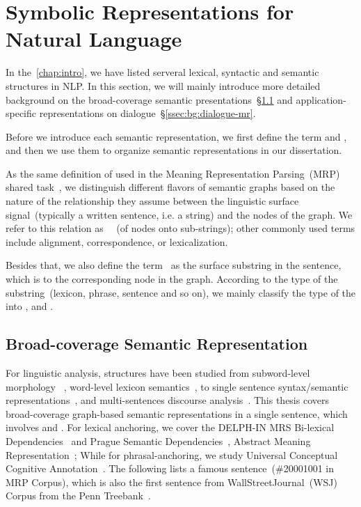 \section{Symbolic Representations for Natural Language}
\label{sec:bg:symbolic}
In the~\autoref{chap:intro}, we have listed serveral lexical,
syntactic and semantic structures in NLP. In this section, we will
mainly introduce more detailed background on the broad-coverage
semantic presentations~\S\ref{ssec:bg:broad-mr} and
application-specific representations on
dialogue~\S\ref{ssec:bg:dialogue-mr}.

Before we introduce each semantic representation, we first define the
term  and , and then we use them to organize
semantic representations in our dissertation.

 As the same definition of  used in the
Meaning Representation Parsing~(MRP) shared
task~\citep{Oep:Abe:Haj:19}, we distinguish different flavors of
semantic graphs based on the nature of the relationship they assume
between the linguistic surface signal~(typically a written sentence,
i.e. a string) and the nodes of the graph. We refer to this relation
as ~~(of nodes onto sub-strings); other commonly used
terms include alignment, correspondence, or lexicalization.

 Besides that, we also define the term~ as
the surface substring in the sentence, which is  to the
corresponding node in the graph. According to the type of the
substring~(lexicon, phrase, sentence and so on), we mainly classify
the type of the  into ,
 and
.


\subsection{Broad-coverage Semantic Representation}
\label{ssec:bg:broad-mr}

For linguistic analysis, structures have been studied from
subword-level morphology ~\citep{beesley2003finite}, word-level
lexicon semantics~\citep{miller1998wordnet}, to single sentence
syntax/semantic
representations~\citep{baker1998berkeley,palmer2005proposition,collins2003head},
and multi-sentences discourse
analysis~\citep{carlson2003building,wolf2005representing,prasad2008penn}. This
thesis covers broad-coverage graph-based semantic representations in a
single sentence, which involves  and
. For lexical anchoring, we cover the DELPH-IN
MRS Bi-lexical Dependencies~\cite[DM,][]{ivanova2012did} and Prague
Semantic
Dependencies~\cite[PSD,][]{hajic2012announcing,miyao2014house},
Abstract Meaning Representation~\cite[AMR,][]{Ban:Bon:Cai:13}; While
for phrasal-anchoring, we study Universal Conceptual Cognitive
Annotation~\cite[UCCA,][]{Abe:Rap:13b}. The following lists a famous
sentence~(\#20001001 in MRP Corpus), which is also the first sentence
from WallStreetJournal~(WSJ) Corpus from the Penn
Treebank~\citep{Mar:San:Mar:93}.

